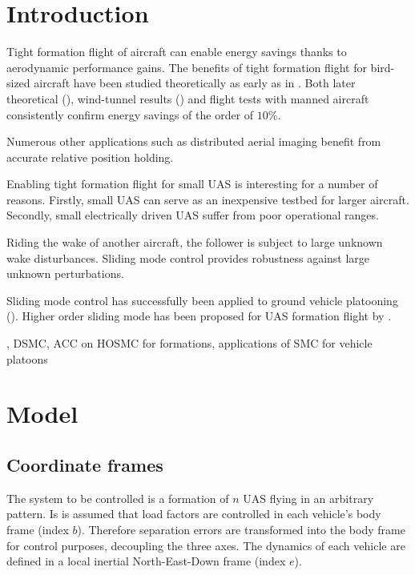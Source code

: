 \documentclass{ifacconf}
\begin{document}
\section{Introduction}
Tight formation flight of aircraft can enable energy savings thanks to aerodynamic performance gains. 
The benefits of tight formation flight for bird-sized aircraft have been studied theoretically as early as in \cite{Hummel1982}. Both later theoretical (\cite{???}), wind-tunnel results  (\cite{???}) and flight tests with manned aircraft consistently confirm energy savings of the order of $10 \%$.

Numerous other applications such as distributed aerial imaging benefit from accurate relative position holding. 

Enabling tight formation flight for small UAS is interesting for a number of reasons. Firstly, small UAS can serve as an inexpensive testbed for larger aircraft. Secondly, small electrically driven UAS suffer from poor operational ranges.

Riding the wake of another aircraft, the follower is subject to large unknown wake disturbances. Sliding mode control provides robustness against large unknown perturbations. 

Sliding mode control has successfully been applied to ground vehicle platooning (\cite{???}). Higher order sliding mode has been proposed for UAS formation flight by \cite{galzi2006uav}.

, DSMC, ACC on HOSMC for formations, applications of SMC for vehicle platoons

\section{Model}

\subsection{Coordinate frames}
The system to be controlled is a formation of $n$ UAS flying in an arbitrary pattern. Is is assumed that
load factors are controlled in each vehicle's body frame (index $b$). Therefore separation errors are transformed into the body frame for control purposes, decoupling the three axes. The dynamics of each vehicle are defined in a local inertial North-East-Down frame (index $e$).
 
\end{document}
